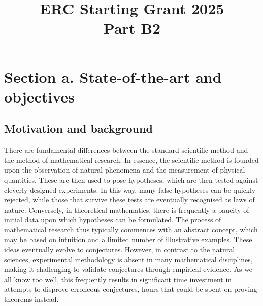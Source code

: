 \documentclass[a4paper,12pt,english]{article}
\begin{document}
\title{ \textbf{\large {ERC Starting Grant 2025} \\ \large Part B2  }}

\author{%
}
\date{}

\maketitle
\thispagestyle{fancy}

\section*{Section a. State-of-the-art and objectives}

\subsection*{Motivation and background}

There are fundamental differences between the standard scientific method and the method of mathematical research.
In essence, the scientific method is founded upon the observation of natural phenomena and the measurement of physical quantities.
These are then used to pose hypotheses, which are then tested against cleverly designed experiments.
In this way, many false hypotheses can be quickly rejected,
while those that survive these tests are eventually recognised as laws of nature.
Conversely, in theoretical mathematics, there is frequently a paucity of initial data upon which hypotheses can be formulated.
The process of mathematical research thus typically commences with an abstract concept, which may be based on intuition and a limited number of illustrative examples. 
These ideas eventually evolve to conjectures.
However, in contrast to the natural sciences, experimental methodology is absent in many mathematical disciplines, making it challenging to validate conjectures through empirical evidence.
As we all know too well, this frequently results in significant time investment in attempts to disprove erroneous conjectures, hours that could be spent on proving theorems instead.
\end{document}
